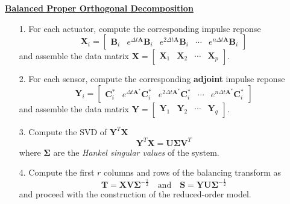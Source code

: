 \documentclass[aspectratio=169, usenames, dvipsnames]{beamer}
\begin{document}
\begin{frame}
  \vfill

  \centering
  \underline{\textbf{Balanced Proper Orthogonal Decomposition}}

  \vfill
  \begin{overprint}
    \begin{enumerate}
      \item[1.] For each actuator, compute the corresponding impulse reponse
      \[
      \bm{X}_i
      =
      \begin{bmatrix}
        \bm{B}_i & e^{\Delta t \bm{A}} \bm{B}_i & e^{2\Delta t \bm{A}} \bm{B}_i & \cdots & e^{n \Delta t \bm{A}} \bm{B}_i
      \end{bmatrix}
      \]
      and assemble the data matrix $\bm{X} = \begin{bmatrix} \bm{X}_1 & \bm{X}_2 & \cdots & \bm{X}_p \end{bmatrix}$.
    \end{enumerate}

    \begin{enumerate}
      \item[2.] For each sensor, compute the corresponding \textbf{adjoint} impulse reponse
      \[
      \bm{Y}_i
      =
      \begin{bmatrix}
        \bm{C}^*_i & e^{\Delta t \bm{A}^*} \bm{C}^*_i & e^{2\Delta t \bm{A}^*} \bm{C}^*_i & \cdots & e^{n \Delta t \bm{A}^*} \bm{C}_i^*
      \end{bmatrix}
      \]
      and assemble the data matrix $\bm{Y} = \begin{bmatrix} \bm{Y}_1 & \bm{Y}_2 & \cdots & \bm{Y}_q \end{bmatrix}$.
    \end{enumerate}

    \begin{enumerate}
      \item[3.] Compute the SVD of $\bm{Y}^T \bm{X}$
      \[
      \bm{Y}^T \bm{X} = \bm{U} \boldsymbol{\Sigma} \bm{V}^T
      \]
      where $\boldsymbol{\Sigma}$ are the \emph{Hankel singular values} of the system.
    \end{enumerate}

    \begin{enumerate}
      \item[4.] Compute the first $r$ columns and rows of the balancing transform as
      \[
      \bm{T} = \bm{X} \bm{V} \boldsymbol{\Sigma}^{-\frac12} \quad \text{and} \quad \bm{S} = \bm{Y} \bm{U} \boldsymbol{\Sigma}^{-\frac12}
      \]
      and proceed with the construction of the reduced-order model.
    \end{enumerate}

  \end{overprint}

  \vfill
\end{frame}
\end{document}
